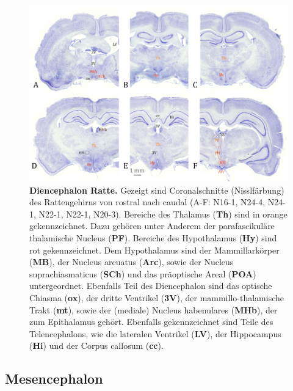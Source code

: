 \documentclass[12pt,a4paper,pdftex]{article}
\begin{document}
\begin{figure}[H]
	    \centering
	    \includegraphics[width=\textwidth]{pictures/Bilder_Jule/Ratte/hypothalamus.png}
	    \caption[Diencephalon Ratte]{\textbf{Diencephalon Ratte.} Gezeigt sind Coronalschnitte (Nisslfärbung) des Rattengehirns von rostral nach caudal (A-F: N16-1, N24-4, N24-1, N22-1, N22-1, N20-3). Bereiche des Thalamus (\textbf{Th}) sind in orange gekennzeichnet. Dazu gehören unter Anderem der parafascikuläre thalamische Nucleus (\textbf{PF}). Bereiche des Hypothalamus (\textbf{Hy}) sind rot gekennzeichnet. Dem Hypothalamus sind der Mammillarkörper (\textbf{MB}), der Nucleus arcuatus (\textbf{Arc}), sowie der Nucleus suprachiasmaticus (\textbf{SCh}) und das präoptische Areal (\textbf{POA}) untergeordnet. Ebenfalls Teil des Diencephalon sind das optische Chiasma (\textbf{ox}), der dritte Ventrikel (\textbf{3V}), der mammillo-thalamische Trakt (\textbf{mt}), sowie der (mediale) Nucleus habenulares (\textbf{MHb}), der zum Epithalamus gehört. Ebenfalls gekennzeichnet sind Teile des Telencephalons, wie die lateralen Ventrikel (\textbf{LV}), der Hippocampus (\textbf{Hi}) und der Corpus callosum (\textbf{cc}).}
	    \label{fig:Diencephalon_Ratte}
\end{figure}{}



\subsection{Mesencephalon}
\label{subsec:Mesencephalon} 
\end{document}
